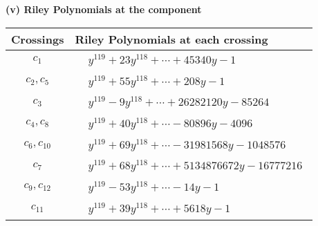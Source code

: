 \documentclass[1p]{elsarticle_modified}
\theoremstyle{definition}
\begin{document}
\newpage\renewcommand{\arraystretch}{1}
\flushleft \textbf{(v) Riley Polynomials at the component}\newline \\
\begin{tabular}{m{50pt}|m{274pt}}
Crossings & \hspace{64pt}Riley Polynomials at each crossing \\
\hline $$\begin{aligned}c_{1}\end{aligned}$$&$\begin{aligned}
&y^{119}+23 y^{118}+\cdots+45340 y-1
\end{aligned}$\\
\hline $$\begin{aligned}c_{2},c_{5}\end{aligned}$$&$\begin{aligned}
&y^{119}+55 y^{118}+\cdots+208 y-1
\end{aligned}$\\
\hline $$\begin{aligned}c_{3}\end{aligned}$$&$\begin{aligned}
&y^{119}-9 y^{118}+\cdots+26282120 y-85264
\end{aligned}$\\
\hline $$\begin{aligned}c_{4},c_{8}\end{aligned}$$&$\begin{aligned}
&y^{119}+40 y^{118}+\cdots-80896 y-4096
\end{aligned}$\\
\hline $$\begin{aligned}c_{6},c_{10}\end{aligned}$$&$\begin{aligned}
&y^{119}+69 y^{118}+\cdots-31981568 y-1048576
\end{aligned}$\\
\hline $$\begin{aligned}c_{7}\end{aligned}$$&$\begin{aligned}
&y^{119}+68 y^{118}+\cdots+5134876672 y-16777216
\end{aligned}$\\
\hline $$\begin{aligned}c_{9},c_{12}\end{aligned}$$&$\begin{aligned}
&y^{119}-53 y^{118}+\cdots-14 y-1
\end{aligned}$\\
\hline $$\begin{aligned}c_{11}\end{aligned}$$&$\begin{aligned}
&y^{119}+39 y^{118}+\cdots+5618 y-1
\end{aligned}$\\
\hline
\end{tabular}\\~\\
\end{document}
